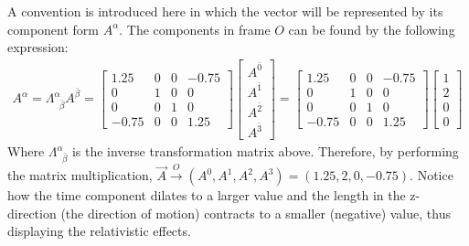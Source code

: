 \documentclass{report}
\begin{document}
\begin{subquests}
\begin{subquests}
		\item		
		A convention is introduced here in which the vector will be represented by its component form $A^{\alpha}$. The components in frame $O$ can be found by the following expression:
		\begin{gather*}
			A^{\alpha}=\Lambda^{\alpha}_{\;\;\bar{\beta}}A^{\bar{\beta}} =
			\begin{bmatrix}
				1.25 & 0 & 0 & -0.75 \\
				0 & 1 & 0 & 0 \\
				0 & 0 & 1 & 0 \\
				-0.75 & 0 & 0 & 1.25
			\end{bmatrix}
			\begin{bmatrix}
		 		A^{\bar{0}} \\
				A^{\bar{1}} \\
				A^{\bar{2}} \\
				A^{\bar{3}}
			\end{bmatrix}
			=
			\begin{bmatrix}
				1.25 & 0 & 0 & -0.75 \\
				0 & 1 & 0 & 0 \\
				0 & 0 & 1 & 0 \\
				-0.75 & 0 & 0 & 1.25
			\end{bmatrix}
			\begin{bmatrix}
		 		1 \\
				2 \\
				0 \\
				0
			\end{bmatrix}	
		\end{gather*}
		Where $\Lambda^{\alpha}_{\;\;\bar{\beta}}$ is the inverse transformation matrix above. Therefore, by performing the matrix multiplication, ${\vec A} \stackrel{O}{\longrightarrow}(A^{0},A^{1},A^{2},A^{3}) = (1.25, 2, 0, -0.75).$ Notice how the time component dilates to a larger value and the length in the z-direction (the direction of motion) contracts to a smaller (negative) value, thus displaying the relativistic effects.
	\end{subquests}


\end{subquests}
\end{document}
